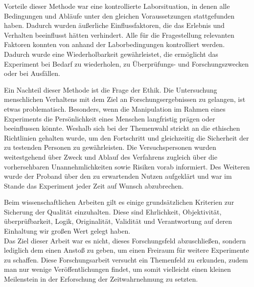 \documentclass{Paper}
\begin{document}
	\par
		Vorteile dieser Methode war eine kontrollierte Laborsituation, in denen alle Bedingungen und
		Abläufe unter den gleichen Voraussetzungen stattgefunden haben. Dadurch wurden äußerliche
		Einflussfaktoren, die das Erlebnis und Verhalten beeinflusst hätten verhindert. Alle für die
		Fragestellung relevanten Faktoren konnten von anhand der Laborbedingungen kontrolliert werden.
		Dadurch wurde eine Wiederholbarkeit gewährleistet, die ermöglicht das Experiment bei Bedarf
		zu wiederholen, zu Überprüfungs- und Forschungszwecken oder bei Ausfällen.
		\par	
			Ein Nachteil dieser Methode ist die Frage der Ethik. Die Untersuchung menschlichen Verhaltens
		mit dem Ziel an Forschungsergebnissen zu gelangen, ist etwas problematisch. Besonders,
		wenn die Manipulation im Rahmen eines Experiments die Persönlichkeit eines Menschen
		langfristig prägen oder beeinflussen könnte. Weshalb sich bei der Themenwahl strickt an die
		ethischen Richtlinien gehalten wurde, um den Fortschritt und gleichzeitig die Sicherheit der zu
		testenden Personen zu gewährleisten. Die Versuchspersonen wurden weitestgehend über
		Zweck und Ablauf des Verfahrens zugleich über die vorhersehbaren Unannehmlichkeiten sowie
		Risiken vorab informiert. Des Weiteren wurde der Proband über den zu erwartenden Nutzen
		aufgeklärt und war im Stande das Experiment jeder Zeit auf Wunsch abzubrechen.
		\par	
Beim wissenschaftlichen Arbeiten gilt es einige grundsätzlichen Kriterien zur Sicherung der Qualität einzuhalten. Diese sind Ehrlichkeit, Objektivität, überprüfbarkeit, Logik, Originalität, Validität 
und Verantwortung auf deren Einhaltung wir großen Wert gelegt haben.\\
Das Ziel dieser Arbeit war es nicht, dieses Forschungsfeld abzuschließen, sondern lediglich dem einen Anstoß zu geben, um einen Freiraum für weitere Experimente zu schaffen. Diese Forschungsarbeit versucht ein Themenfeld zu erkunden, zudem man nur wenige Veröffentlichungen findet, um somit vielleicht einen kleinen Meilenstein in der Erforschung der Zeitwahrnehmung zu setzten.		

	
\end{document}
